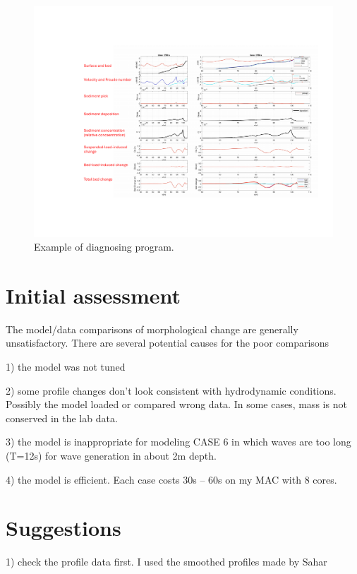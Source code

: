 \documentclass[preprint,10pt]{elsarticle}
\begin{document}
 \begin{figure}
\begin{center}
 \includegraphics[width=1.0\textwidth]{diagnose.pdf}
 \caption{Example of diagnosing program. }
 \label{lineargrid}
 \end{center}
 \end{figure}

\section*{Initial assessment}  

The model/data comparisons of morphological change are generally unsatisfactory. There are several potential causes for the poor comparisons

1) the model was not tuned 

2) some profile changes don't look consistent with hydrodynamic conditions. Possibly the model loaded or compared wrong data. In some cases, mass is not conserved in the lab data. 

3) the model is inappropriate for modeling CASE 6 in which waves are too long (T=12s) for wave generation in about 2m depth.  

4) the model is efficient. Each case costs 30s -- 60s on my MAC with 8 cores. 

\section*{Suggestions}  

1) check the profile data first. I used the smoothed profiles made by Sahar
\end{document}
